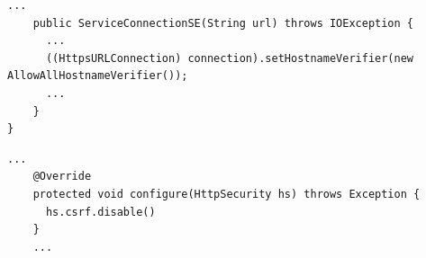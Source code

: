 \begin{lstlisting}[caption={A code snippet showing insecure use of AllHostNameVerifier.}, 
label={listing:AllHostNameVerifier}]
    ...
    public ServiceConnectionSE(String url) throws IOException {
      ...
      ((HttpsURLConnection) connection).setHostnameVerifier(new AllowAllHostnameVerifier());
      ...
    } 
}
\end{lstlisting}

\begin{lstlisting}[caption={A code snippet showing insecure use of turning off CSRF protection.}, 
label={listing:csrf-protection}]
    ...
    @Override
    protected void configure(HttpSecurity hs) throws Exception {
      hs.csrf.disable()
    }
    ...
\end{lstlisting}

